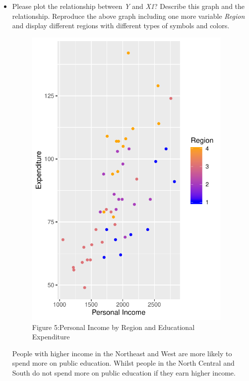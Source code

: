 \documentclass[12pt,letterpaper]{article}
\begin{document}
\begin{itemize}
		\item
		Please plot the relationship between \emph{Y} and \emph{X1}? Describe this graph and the relationship. Reproduce the above graph including one more variable \emph{Region} and display different regions with different types of symbols and colors.
		\vspace{.5cm}
		  
		\vspace{.5cm}
	       \begin{figure}\centering
	       	\caption{Figure 5:Personal Income by Region and Educational Expenditure}
	       	\includegraphics[width=0.95\textwidth]{Rplot5.pdf}
            \end{figure}	
		People with higher income in the Northeast and West are more likely to spend more on public education.
		Whilst people in the North Central and South do not spend more on public education if they earn higher income. 
		
	\end{itemize}
	
\end{document}
